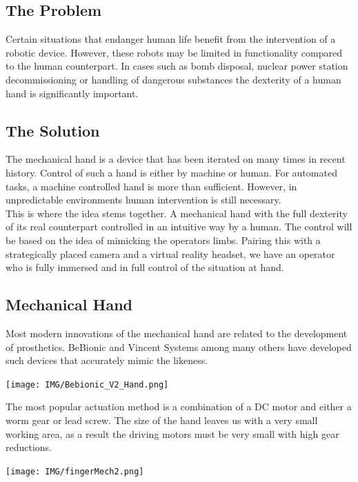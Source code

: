 \documentclass{article}
\begin{document}
\subsection{The Problem}
Certain situations that endanger human life benefit from the intervention of a robotic device. However, these robots may be limited in functionality compared to the human counterpart. In cases such as bomb disposal, nuclear power station decommissioning or handling of dangerous substances the dexterity of a human hand is significantly important.

\subsection{The Solution}
The mechanical hand is a device that has been iterated on many times in recent history. Control of such a hand is either by machine or human. For automated tasks, a machine controlled hand is more than sufficient. However, in unpredictable environments human intervention is still necessary.\\[12pt]
\indent This is where the idea stems together. A mechanical hand with the full dexterity of its real counterpart controlled in an intuitive way by a human. The control will be based on the idea of mimicking the operators limbs. Pairing this with a strategically placed camera and a virtual reality headset, we have an operator who is fully immersed and in full control of the situation at hand.

\subsection{Mechanical Hand}
Most modern innovations of the mechanical hand are related to the development of prosthetics. BeBionic \cite{bebionic} and Vincent Systems \cite{vincent} among many others have developed such devices that accurately mimic the likeness.

\begin{center}
\texttt{[image: IMG/Bebionic\_V2\_Hand.png]}
\end{center}

The most popular actuation method is a combination of a DC motor and either a worm gear or lead screw. The size of the hand leaves us with a very small working area, as a result the driving motors must be very small with high gear reductions.

\begin{center}
\texttt{[image: IMG/fingerMech2.png]}
\end{center}
\end{document}
